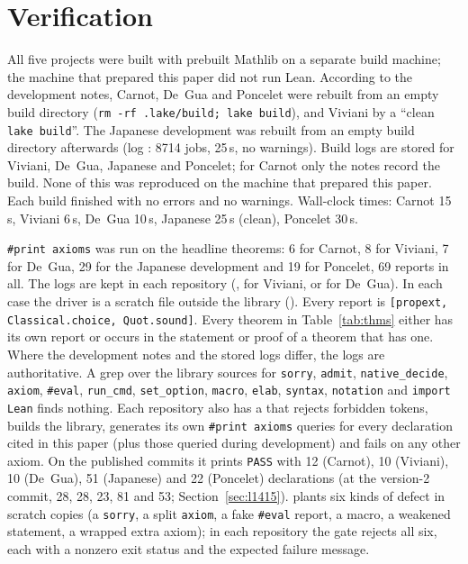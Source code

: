 \documentclass[11pt]{article}
\theoremstyle{definition}
\theoremstyle{remark}
\newcommand{\code}[1]{\texttt{#1}}
\begin{document}
\section{Verification}\label{sec:verify}

All five projects were built with prebuilt Mathlib on a separate build machine; the machine that
prepared this paper did not run Lean. According to the development notes, Carnot, De~Gua and Poncelet were
rebuilt from an empty build directory (\code{rm -rf .lake/build; lake build}), and Viviani by a
``clean \code{lake build}''. The Japanese development was rebuilt from an empty build directory afterwards
(log : 8714 jobs, 25\,s, no warnings).
Build logs are stored for Viviani, De~Gua, Japanese and Poncelet; for Carnot only the notes
record the build. None of this was reproduced on the machine that prepared this paper.
Each build finished with no errors and no warnings. Wall-clock times: Carnot 15\,s, Viviani 6\,s,
De~Gua 10\,s, Japanese 25\,s (clean), Poncelet 30\,s.

\code{\#print axioms} was run on the headline theorems: 6 for Carnot, 8 for Viviani, 7 for
De~Gua, 29 for the Japanese development and 19 for Poncelet, 69 reports in all. The logs are kept
in each repository (,  for Viviani, or 
for De~Gua). In each case the driver is a scratch file outside the library ().
Every report is \code{[propext, Classical.choice, Quot.sound]}. Every theorem in
Table~\ref{tab:thms} either has its own report or occurs in the statement or proof of a theorem
that has one. Where the development notes and the stored logs differ, the logs are authoritative. A grep over the library sources for
\code{sorry}, \code{admit}, \code{native\_decide}, \code{axiom}, \code{\#eval}, \code{run\_cmd},
\code{set\_option}, \code{macro}, \code{elab}, \code{syntax}, \code{notation} and
\code{import Lean} finds nothing. Each repository also has a  that rejects
forbidden tokens, builds the library, generates its own \code{\#print axioms} queries for every
declaration cited in this paper (plus those queried during development) and fails on any other
axiom. On the published commits it prints \code{PASS} with 12 (Carnot), 10 (Viviani), 10 (De~Gua),
51 (Japanese) and 22 (Poncelet) declarations (at the version-2 commit, 28, 28, 23, 81 and 53; Section~\ref{sec:l1415}).  plants six kinds of defect in
scratch copies (a \code{sorry}, a split \code{axiom}, a fake \code{\#eval} report, a macro, a
weakened statement, a wrapped extra axiom); in each repository the gate rejects all six, each with
a nonzero exit status and the expected failure message.
\end{document}
